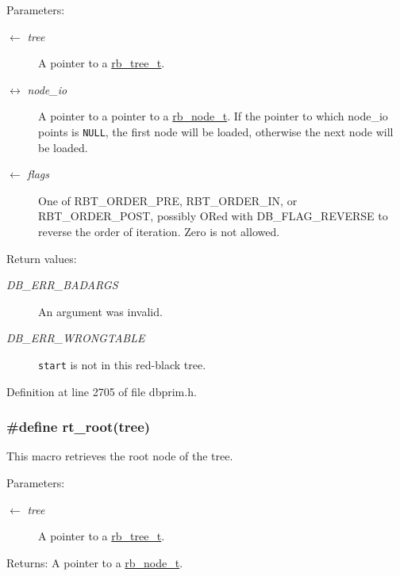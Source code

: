 \begin{Desc}
\item[Parameters:]
\begin{description}
\item[\mbox{$\leftarrow$} {\em tree}]A pointer to a \hyperlink{group__dbprim__rbtree_ga0}{rb\_\-tree\_\-t}. \item[\mbox{$\leftrightarrow$} {\em node\_\-io}]A pointer to a pointer to a \hyperlink{group__dbprim__rbtree_ga1}{rb\_\-node\_\-t}. If the pointer to which node\_\-io points is {\tt NULL}, the first node will be loaded, otherwise the next node will be loaded. \item[\mbox{$\leftarrow$} {\em flags}]One of RBT\_\-ORDER\_\-PRE, RBT\_\-ORDER\_\-IN, or RBT\_\-ORDER\_\-POST, possibly ORed with DB\_\-FLAG\_\-REVERSE to reverse the order of iteration. Zero is not allowed.\end{description}
\end{Desc}
\begin{Desc}
\item[Return values:]
\begin{description}
\item[{\em DB\_\-ERR\_\-BADARGS}]An argument was invalid. \item[{\em DB\_\-ERR\_\-WRONGTABLE}]{\tt start} is not in this red-black tree.\end{description}
\end{Desc}


Definition at line 2705 of file dbprim.h.\hypertarget{group__dbprim__rbtree_ga22}{
\subsubsection[rt\_\-root]{\setlength{\rightskip}{0pt plus 5cm}\#define rt\_\-root(tree)}}
\label{group__dbprim__rbtree_ga22}


This macro retrieves the root node of the tree.

\begin{Desc}
\item[Parameters:]
\begin{description}
\item[\mbox{$\leftarrow$} {\em tree}]A pointer to a \hyperlink{group__dbprim__rbtree_ga0}{rb\_\-tree\_\-t}.\end{description}
\end{Desc}
\begin{Desc}
\item[Returns:]A pointer to a \hyperlink{group__dbprim__rbtree_ga1}{rb\_\-node\_\-t}.\end{Desc}


